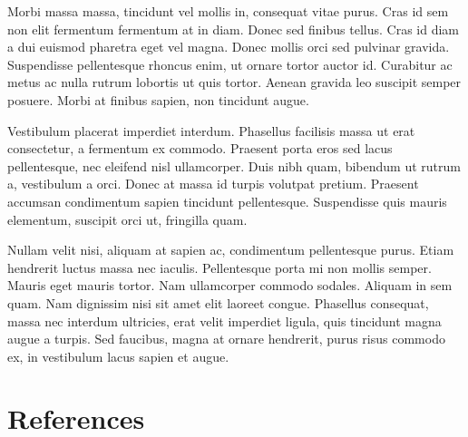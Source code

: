 \documentclass[12pt,a4paper]{article}
\begin{document}
Morbi massa massa, tincidunt vel mollis in, consequat vitae purus. Cras id sem non elit fermentum fermentum at in diam. Donec sed finibus tellus. Cras id diam a dui euismod pharetra eget vel magna. Donec mollis orci sed pulvinar gravida. Suspendisse pellentesque rhoncus enim, ut ornare tortor auctor id. Curabitur ac metus ac nulla rutrum lobortis ut quis tortor. Aenean gravida leo suscipit semper posuere. Morbi at finibus sapien, non tincidunt augue.

Vestibulum placerat imperdiet interdum. Phasellus facilisis massa ut erat consectetur, a fermentum ex commodo. Praesent porta eros sed lacus pellentesque, nec eleifend nisl ullamcorper. Duis nibh quam, bibendum ut rutrum a, vestibulum a orci. Donec at massa id turpis volutpat pretium. Praesent accumsan condimentum sapien tincidunt pellentesque. Suspendisse quis mauris elementum, suscipit orci ut, fringilla quam.

Nullam velit nisi, aliquam at sapien ac, condimentum pellentesque purus. Etiam hendrerit luctus massa nec iaculis. Pellentesque porta mi non mollis semper. Mauris eget mauris tortor. Nam ullamcorper commodo sodales. Aliquam in sem quam. Nam dignissim nisi sit amet elit laoreet congue. Phasellus consequat, massa nec interdum ultricies, erat velit imperdiet ligula, quis tincidunt magna augue a turpis. Sed faucibus, magna at ornare hendrerit, purus risus commodo ex, in vestibulum lacus sapien et augue. 

\newpage
\section{References}
\end{document}
